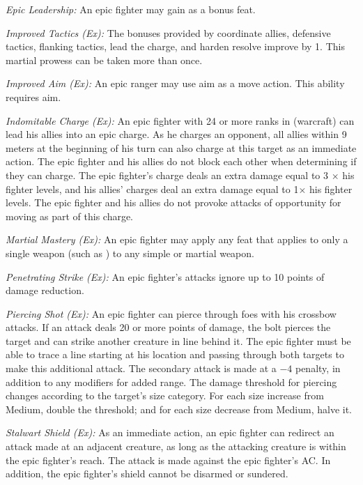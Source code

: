 \textit{Epic Leadership:} An epic fighter may gain  as a bonus feat.

\textit{Improved Tactics (Ex):} The bonuses provided by coordinate allies, defensive tactics, flanking tactics, lead the charge, and harden resolve improve by 1. This martial prowess can be taken more than once.

\textit{Improved Aim (Ex):} An epic ranger may use aim as a move action. This ability requires aim.

\textit{Indomitable Charge (Ex):} An epic fighter with 24 or more ranks in  (warcraft) can lead his allies into an epic charge. As he charges an opponent, all allies within 9 meters at the beginning of his turn can also charge at this target as an immediate action. The epic fighter and his allies do not block each other when determining if they can charge. The epic fighter's charge deals an extra damage equal to 3 $\times$ his fighter levels, and his allies' charges deal an extra damage equal to 1\onehalf $\times$ his fighter levels. The epic fighter and his allies do not provoke attacks of opportunity for moving as part of this charge.

\textit{Martial Mastery (Ex):} An epic fighter may apply any feat that applies to only a single weapon (such as ) to any simple or martial weapon.

\textit{Penetrating Strike (Ex):} An epic fighter's attacks ignore up to 10 points of damage reduction.

\textit{Piercing Shot (Ex):} An epic fighter can pierce through foes with his crossbow attacks. If an attack deals 20 or more points of damage, the bolt pierces the target and can strike another creature in line behind it. The epic fighter must be able to trace a line starting at his location and passing through both targets to make this additional attack. The secondary attack is made at a $-4$ penalty, in addition to any modifiers for added range. The damage threshold for piercing changes according to the target's size category. For each size increase from Medium, double the threshold; and for each size decrease from Medium, halve it.

\textit{Stalwart Shield (Ex):} As an immediate action, an epic fighter can redirect an attack made at an adjacent creature, as long as the attacking creature is within the epic fighter's reach. The attack is made against the epic fighter's AC. In addition, the epic fighter's shield cannot be disarmed or sundered.

